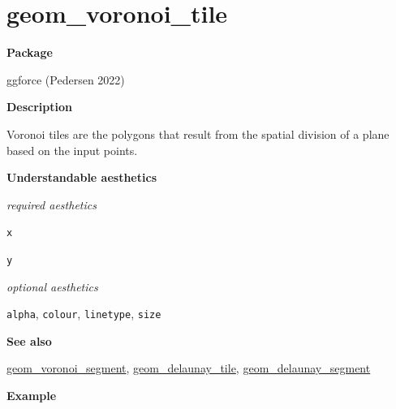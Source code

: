 \documentclass[
  letterpaper,
  DIV=11,
  numbers=noendperiod]{scrreprt}
\begin{document}
\section{geom\_voronoi\_tile}\label{geom_voronoi_tile}

\textbf{Package}

ggforce (Pedersen 2022)

\textbf{Description}

Voronoi tiles are the polygons that result from the spatial division of
a plane based on the input points.

\textbf{Understandable aesthetics}

\emph{required aesthetics}

\texttt{x}

\texttt{y}

\emph{optional aesthetics}

\texttt{alpha}, \texttt{colour}, \texttt{linetype}, \texttt{size}

\textbf{See also}

\hyperref[voroni_segment]{geom\_voronoi\_segment},
\hyperref[delaunay_tile]{geom\_delaunay\_tile},
\hyperref[delaunay_segment]{geom\_delaunay\_segment}

\textbf{Example}
\end{document}

